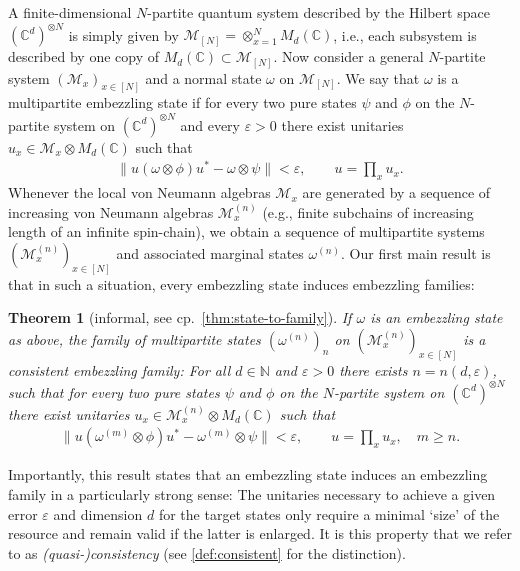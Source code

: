 \documentclass[a4paper, 10pt, onecolumn, accepted=2025-07-22]{quantumarticle}
\newtheorem{introtheorem}{Theorem} %
\theoremstyle{definition}
\newcommand{\norm}[1]{\lVert #1\rVert}
\newcommand{\ox}{\otimes}
\newcommand{\mc}{\mathcal}
\newcommand{\eps}{\varepsilon}
\def\CC{{\mathbb C}}
\def\M{{\mc M}}
\def\NN{{\mathbb N}}
\newcommand*{\1}{\text{\usefont{U}{bbold}{m}{n}1}}
\begin{document}
A finite-dimensional $N$-partite quantum system described by the Hilbert space $(\CC^d)^{\otimes N}$ is simply given by $\M_{[N]} = \otimes_{x=1}^N M_d(\CC)$, i.e., each subsystem is described by one copy of $M_d(\CC)\subset \M_{[N]}$. 
Now consider a general $N$-partite system $(\M_x)_{x\in[N]}$ and a normal state $\omega$ on $\M_{[N]}$. We say that $\omega$ is a multipartite embezzling state if for every two pure states $\psi$ and $\phi$ on the $N$-partite system on $(\CC^d)^{\otimes N}$ and every $\eps>0$ there exist unitaries $u_x \in \M_x\ox M_d(\CC)$ such that
\begin{align}
    \norm{u(\omega\ox \phi)u^* - \omega\ox \psi} < \eps,\qquad u = \prod_x u_x.
\end{align}
Whenever the local von Neumann algebras $\M_x$ are generated by a sequence of increasing von Neumann algebras $\M^{(n)}_x$ (e.g., finite subchains of increasing length of an infinite spin-chain), we obtain a sequence of multipartite systems $(\M^{(n)}_x)_{x\in[N]}$ and associated marginal states $\omega^{(n)}$. 
Our first main result is that in such a situation, every embezzling state induces embezzling families:
\begin{introtheorem}[informal, see cp.~\cref{thm:state-to-family}]\label{introthm:state-to-family} 
    If $\omega$ is an embezzling state as above, the family of multipartite states $(\omega^{(n)})_n$ on $(\M_x^{(n)})_{x\in[N]}$ is a \emph{consistent embezzling family}: For all $d\in\NN$ and $\eps>0$ there exists $n=n(d,\eps)$, such that for every two pure states $\psi$ and $\phi$ on the $N$-partite system on $(\CC^d)^{\otimes N}$ there exist unitaries $u_x \in \M_x^{(n)}\ox M_d(\CC)$ such that
    \begin{align}
       \norm{u(\omega^{(m)}\ox \phi)u^* - \omega^{(m)}\ox \psi} < \eps,\qquad u = \prod_x u_x,\quad m\geq n. 
    \end{align}
\end{introtheorem}

Importantly, this result states that an embezzling state induces an embezzling family in a particularly strong sense: The unitaries necessary to achieve a given error $\eps$ and dimension $d$ for the target states only require a minimal `size' of the resource and remain valid if the latter is enlarged. It is this property that we refer to as \emph{(quasi-)consistency} (see \cref{def:consistent} for the distinction).
\end{document}
